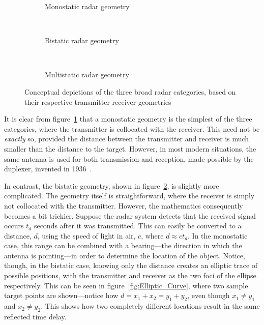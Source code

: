 \documentclass[class=report,11pt,crop=false]{standalone}
\begin{document}
\begin{figure}[htbp]
    \centering
    \begin{subfigure}[t]{0.48\textwidth}
        \centering
        \def\svgwidth{\linewidth}
        { %
            }
        \caption{Monostatic radar geometry}
        \label{fig:Geometry_Monostatic}
    \end{subfigure}%
    ~ 
    \begin{subfigure}[t]{0.48\textwidth}
        \centering
        \def\svgwidth{\linewidth}
        { %
            }
        \caption{Bistatic radar geometry}
        \label{fig:Geometry_Bistatic}
    \end{subfigure}
    ~
    \begin{subfigure}[t]{0.6\textwidth}
        \centering
        \def\svgwidth{\linewidth}
        { %
            }
        \caption{Multistatic radar geometry}
        \label{fig:Geometry_Multistatic}
    \end{subfigure}%
    \caption{Conceptual depictions of the three broad radar categories, based on their respective transmitter-receiver geometries}
    \label{fig:Radar_Geometry_Depictions}
\end{figure}

It is clear from figure~\ref{fig:Geometry_Monostatic} that a monostatic geometry is the simplest of the three categories, where the transmitter is collocated with the receiver. This need not be \emph{exactly} so, provided the distance between the transmitter and receiver is much smaller than the distance to the target. However, in most modern situations, the same antenna is used for both transmission and reception, made possible by the duplexer, invented in 1936~\cite{kuschel-hagan-history}.

In contrast, the bistatic geometry, shown in figure~\ref{fig:Geometry_Bistatic}, is slightly more complicated. The geometry itself is straightforward, where the receiver is simply not collocated with the transmitter. However, the mathematics consequently becomes a bit trickier. Suppose the radar system detects that the received signal occurs \(t_d\) seconds after it was transmitted. This can easily be converted to a distance, \(d\), using the speed of light in air, \(c\), where \(d \approx ct_d\). In the monostatic case, this range can be combined with a bearing---the direction in which the antenna is pointing---in order to determine the location of the object. Notice, though, in the bistatic case, knowing only the distance creates an elliptic trace of possible positions, with the transmitter and receiver as the two foci of the ellipse respectively. This can be seen in figure~\ref{fig:Elliptic_Curve}, where two sample target points are shown---notice how \(d = x_1 + x_2 = y_1 + y_2\), even though \(x_1 \ne y_1\) and \(x_2 \ne y_2\). This shows how two completely different locations result in the same reflected time delay.
\end{document}
